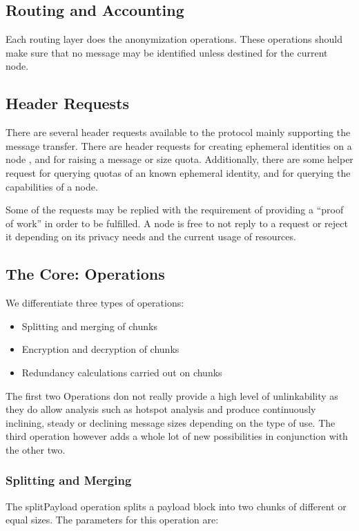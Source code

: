 \documentclass[10pt,journal,compsoc]{IEEEtran}
\begin{document}
\subsection{Routing and Accounting\label{sec:routingAndAccounting}}
Each routing layer does the anonymization operations. These operations should make sure that no message may be identified unless destined for the current node. 

\subsection{Header Requests}
There are several header requests available to the protocol mainly supporting the message transfer. There are header requests for creating ephemeral identities on a node , and for raising a message or size quota. Additionally, there are some helper request for querying quotas of an known ephemeral identity, and for querying the capabilities of a node.

Some of the requests may be replied with the requirement of providing a ``proof of work'' in order to be fulfilled. A node is free to not reply to a request or reject it depending on its privacy needs and the current usage of resources.

\subsection{The Core: Operations}
We differentiate three types of operations:
\begin{itemize}
	\item Splitting and merging of chunks
	\item Encryption and decryption of chunks
	\item Redundancy calculations carried out on chunks
\end{itemize}

The first two Operations don not really provide a high level of unlinkability as they do allow analysis such as hotspot analysis and produce continuously inclining, steady or declining message sizes depending on the type of use. The third operation however adds a whole lot of new possibilities in conjunction with the other two.

\subsubsection{Splitting and Merging}
The splitPayload operation splits a payload block into two chunks of different or equal sizes. The parameters for this operation are:
\end{document}
